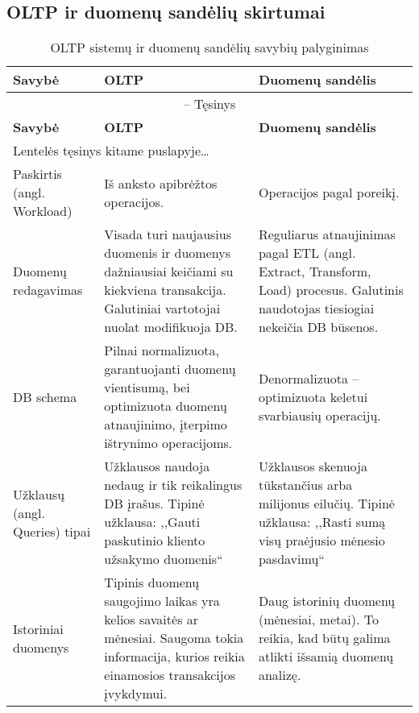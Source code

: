 \documentclass[12pt,a4paper,titlepage]{article}
\begin{document}
\subsection{OLTP ir duomenų sandėlių skirtumai}

\begin{longtable}{|p{3cm}|p{4.9cm}|p{4.9cm}|}
\caption{OLTP sistemų ir duomenų sandėlių savybių palyginimas\label{table:oltpsvsdw}}\\

\hline \hline
{\textbf{Savybė}} &
{\textbf{OLTP}} &
{\textbf{Duomenų sandėlis}}\\
\hline
\endfirsthead


\multicolumn{3}{c}{{\tablename} \thetable{} -- Tęsinys} \\[0.5ex]
\hline \hline
{\textbf{Savybė}} &
{\textbf{OLTP}} &
{\textbf{Duomenų sandėlis}}\\
\hline
\endhead


\multicolumn{3}{l}{{Lentelės tęsinys kitame puslapyje\ldots}} \\
\endfoot


\hline \hline
\endlastfoot
\hline 
Paskirtis (angl. Workload)
&
Iš anksto apibrėžtos operacijos.
&
Operacijos pagal poreikį.
\\
\hline
Duomenų redagavimas
&
Visada turi naujausius duomenis ir duomenys dažniausiai keičiami su kiekviena transakcija. Galutiniai vartotojai nuolat modifikuoja DB.
&
Reguliarus atnaujinimas pagal ETL (angl. Extract, Transform, Load) procesus. Galutinis naudotojas tiesiogiai nekeičia DB būsenos.
\\
\hline
DB schema
&
Pilnai normalizuota, garantuojanti duomenų vientisumą, bei optimizuota duomenų atnaujinimo, įterpimo ištrynimo operacijoms.
&
Denormalizuota – optimizuota keletui svarbiausių operacijų.
\\
\hline
Užklausų (angl. Queries) tipai
&
Užklausos naudoja nedaug ir tik reikalingus DB įrašus. Tipinė užklausa: ,,Gauti paskutinio kliento užsakymo duomenis``
&
Užklausos skenuoja tūkstančius arba milijonus eilučių. Tipinė užklausa: ,,Rasti sumą visų praėjusio mėnesio pasdavimų``
\\
\hline
Istoriniai duomenys
&
Tipinis duomenų saugojimo laikas yra kelios savaitės ar mėnesiai. Saugoma tokia informacija, kurios reikia einamosios transakcijos įvykdymui.
&
Daug istorinių duomenų (mėnesiai, metai). To reikia, kad būtų galima atlikti išsamią duomenų analizę.
\end{longtable}
\end{document}
